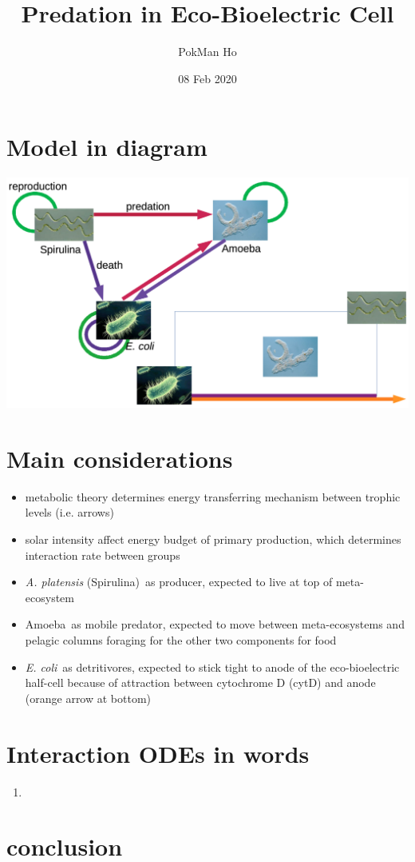 \documentclass[a4paper,11pt]{article}
\title{Predation in Eco-Bioelectric Cell}
\author{PokMan Ho}
\date{08 Feb 2020}
\newcommand{\ec}{\textit{E. coli}}
\newcommand{\am}{Amoeba}
\newcommand{\ap}{\textit{A. platensis} (Spirulina)}
\begin{document}
    \maketitle
    \tableofcontents

    \section{Model in diagram}
    \includegraphics[width=\linewidth]{sandbox/graph/model.png}
    
    \section{Main considerations}
    \begin{itemize}
        \item metabolic theory determines energy transferring mechanism between trophic levels (i.e. arrows)
        \item solar intensity affect energy budget of primary production, which determines interaction rate between groups
        \item \ap\ as producer, expected to live at top of meta-ecosystem
        \item \am\ as mobile predator, expected to move between meta-ecosystems and pelagic columns foraging for the other two components for food
        \item \ec\ as detritivores, expected to stick tight to anode of the eco-bioelectric half-cell because of attraction between cytochrome D (cytD) and anode (orange arrow at bottom)
    \end{itemize}
    
    \section{Interaction ODEs in words}
    \begin{enumerate}
        \item 
    \end{enumerate}
    
    \section{conclusion}
    
    \nocite{*}\printbibliography
\end{document}

